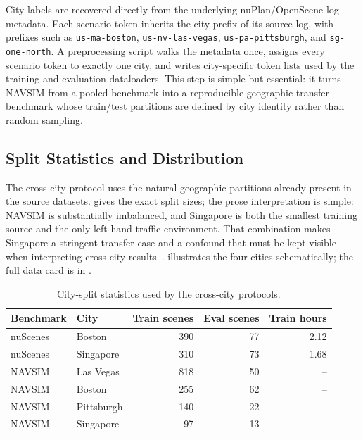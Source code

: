 City labels are recovered directly from the underlying nuPlan/OpenScene log metadata. Each scenario token inherits the city prefix of its source log, with prefixes such as \texttt{us-ma-boston}, \texttt{us-nv-las-vegas}, \texttt{us-pa-pittsburgh}, and \texttt{sg-one-north}. A preprocessing script walks the metadata once, assigns every scenario token to exactly one city, and writes city-specific token lists used by the training and evaluation dataloaders. This step is simple but essential: it turns NAVSIM from a pooled benchmark into a reproducible geographic-transfer benchmark whose train/test partitions are defined by city identity rather than random sampling.

\subsection{Split Statistics and Distribution}
\label{sec:meth-split-stats}

The cross-city protocol uses the natural geographic partitions already present in the source datasets.  gives the exact split sizes; the prose interpretation is simple: NAVSIM is substantially imbalanced, and Singapore is both the smallest training source and the only left-hand-traffic environment. That combination makes Singapore a stringent transfer case and a confound that must be kept visible when interpreting cross-city results~\cite{naeinian-cross-city-2026}.  illustrates the four cities schematically; the full data card is in .

\begin{table}[ht]
\centering
\caption{City-split statistics used by the cross-city protocols.}
\label{tab:meth-split-stats}
\small
\renewcommand{\arraystretch}{1.15}
\setlength{\tabcolsep}{6pt}
\begin{tabular}{@{}llrrr@{}}
\toprule
\textbf{Benchmark} & \textbf{City} & \textbf{Train scenes} & \textbf{Eval scenes} & \textbf{Train hours} \\
\midrule
nuScenes & Boston & 390 & 77 & 2.12 \\
nuScenes & Singapore & 310 & 73 & 1.68 \\
\midrule
NAVSIM & Las Vegas & 818 & 50 & -- \\
NAVSIM & Boston & 255 & 62 & -- \\
NAVSIM & Pittsburgh & 140 & 22 & -- \\
NAVSIM & Singapore & 97 & 13 & -- \\
\bottomrule
\end{tabular}
\end{table}

